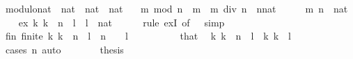 \begin{isabellebody}
\isanewline
{}\isamarkupfalse%
\ modulo{\isacharunderscore}{\kern0pt}nat\ {\isacharcolon}{\kern0pt}{\isacharcolon}{\kern0pt}\ {\isachardoublequoteopen}nat\ {\isasymRightarrow}\ nat\ {\isasymRightarrow}\ nat{\isachardoublequoteclose}\isanewline
\ \ \ {\isachardoublequoteopen}m\ mod\ n\ {\isacharequal}{\kern0pt}\ m\ {\isacharminus}{\kern0pt}\ {\isacharparenleft}{\kern0pt}m\ div\ n\ {\isacharasterisk}{\kern0pt}\ {\isacharparenleft}{\kern0pt}n{\isacharcolon}{\kern0pt}{\isacharcolon}{\kern0pt}nat{\isacharparenright}{\kern0pt}{\isacharparenright}{\kern0pt}{\isachardoublequoteclose}\isanewline
\isanewline
{}\isamarkupfalse%
%
\isadelimproof
\ %
\endisadelimproof
%
\isatagproof
{}\isamarkupfalse%
\isanewline
\ \ \isamarkupfalse%
\ m\ n\ {\isacharcolon}{\kern0pt}{\isacharcolon}{\kern0pt}\ nat\isanewline
\ \ \isamarkupfalse%
\ ex{\isacharcolon}{\kern0pt}\ {\isachardoublequoteopen}{\isasymexists}k{\isachardot}{\kern0pt}\ k\ {\isacharasterisk}{\kern0pt}\ n\ {\isasymle}\ l{\isachardoublequoteclose}\ \ l\ {\isacharcolon}{\kern0pt}{\isacharcolon}{\kern0pt}\ nat\isanewline
\ \ \ \ \isamarkupfalse%
\ {\isacharparenleft}{\kern0pt}rule\ exI\ {\isacharbrackleft}{\kern0pt}of\ {\isacharunderscore}{\kern0pt}\ {}{\isacharbrackright}{\kern0pt}{\isacharparenright}{\kern0pt}\ simp\isanewline
\ \ \isamarkupfalse%
\ fin{\isacharcolon}{\kern0pt}\ {\isachardoublequoteopen}finite\ {\isacharbraceleft}{\kern0pt}k{\isachardot}{\kern0pt}\ k\ {\isacharasterisk}{\kern0pt}\ n\ {\isasymle}\ l{\isacharbraceright}{\kern0pt}{\isachardoublequoteclose}\ \ {\isachardoublequoteopen}n\ {\isachargreater}{\kern0pt}\ {}{\isachardoublequoteclose}\ \ l\isanewline
\ \ \isamarkupfalse%
\ {\isacharminus}{\kern0pt}\isanewline
\ \ \ \ \isamarkupfalse%
\ that\ \isamarkupfalse%
\ {\isachardoublequoteopen}{\isacharbraceleft}{\kern0pt}k{\isachardot}{\kern0pt}\ k\ {\isacharasterisk}{\kern0pt}\ n\ {\isasymle}\ l{\isacharbraceright}{\kern0pt}\ {\isasymsubseteq}\ {\isacharbraceleft}{\kern0pt}k{\isachardot}{\kern0pt}\ k\ {\isasymle}\ l{\isacharbraceright}{\kern0pt}{\isachardoublequoteclose}\isanewline
\ \ \ \ \ \ \isamarkupfalse%
\ {\isacharparenleft}{\kern0pt}cases\ n{\isacharparenright}{\kern0pt}\ auto\isanewline
\ \ \ \ \isamarkupfalse%
\ \isamarkupfalse%
\ {\isacharquery}{\kern0pt}thesis\isanewline
\ \ \ \ \ \ \isamarkupfalse%

\end{isabellebody}
